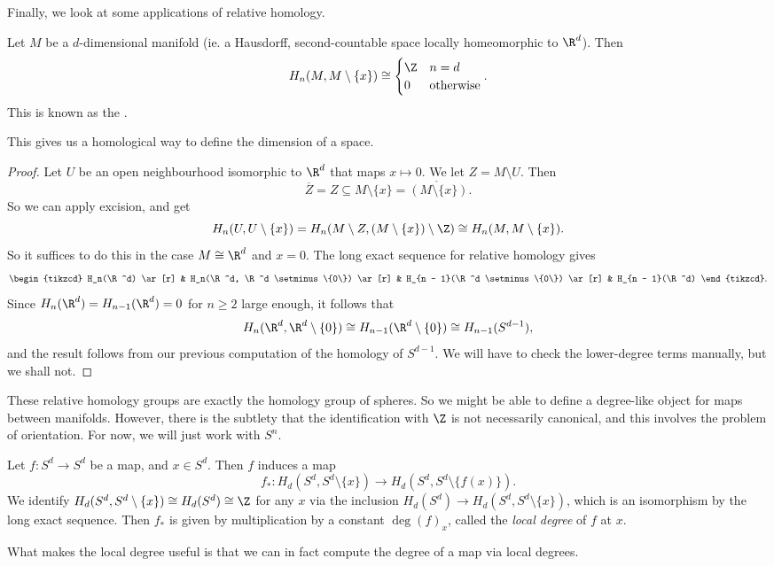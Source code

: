 \documentclass[a4paper]{article}
\theoremstyle{definition}
\begin{document}
Finally, we look at some applications of relative homology.

\begin{lemma}
  Let $M$ be a $d$-dimensional manifold (ie. a Hausdorff, second-countable space locally homeomorphic to $\R^d$). Then
  \[
    H_n(M, M \setminus \{x\}) \cong
    \begin{cases}
      \Z & n = d\\
      0 & \text{otherwise}
    \end{cases}.
  \]
  This is known as the .
\end{lemma}
This gives us a homological way to define the dimension of a space.

\begin{proof}
  Let $U$ be an open neighbourhood isomorphic to $\R^d$ that maps $x \mapsto 0$. We let $Z = M\setminus U$. Then
  \[
    \overline{Z} = Z \subseteq M \setminus \{x\} = \mathring{(M \setminus \{x\})}.
  \]
  So we can apply excision, and get
  \[
    H_n(U, U \setminus \{x\}) = H_n(M\setminus Z, (M\setminus \{x\})\setminus \Z) \cong H_n(M, M\setminus \{x\}).
  \]
  So it suffices to do this in the case $M \cong \R^d$ and $x = 0$. The long exact sequence for relative homology gives
  \[
    \begin{tikzcd}
      H_n(\R^d) \ar[r] & H_n(\R^d, \R^d \setminus \{0\}) \ar[r] & H_{n - 1}(\R^d \setminus \{0\}) \ar[r] & H_{n - 1}(\R^d)
    \end{tikzcd}.
  \]
  Since $H_n(\R^d) = H_{n - 1}(\R^d) = 0$ for $n \geq 2$ large enough, it follows that
  \[
    H_n(\R^d, \R^d \setminus \{0\}) \cong H_{n - 1}(\R^d \setminus \{0\}) \cong H_{n - 1}(S^{d - 1}),
  \]
  and the result follows from our previous computation of the homology of $S^{d - 1}$. We will have to check the lower-degree terms manually, but we shall not.
\end{proof}

These relative homology groups are exactly the homology group of spheres. So we might be able to define a degree-like object for maps between manifolds. However, there is the subtlety that the identification with $\Z$ is not necessarily canonical, and this involves the problem of orientation. For now, we will just work with $S^n$.

\begin{defi}
  Let $f: S^d \to S^d$ be a map, and $x \in S^d$. Then $f$ induces a map
  \[
    f_*: H_d(S^d, S^d \setminus \{x\}) \to H_d(S^d, S^d \setminus \{f(x)\}).
  \]
  We identify $H_d(S^d, S^d \setminus \{x\}) \cong H_d(S^d) \cong \Z$ for any $x$ via the inclusion $H_d(S^d) \to H_d(S^d, S^d \setminus \{x\})$, which is an isomorphism by the long exact sequence. Then $f_*$ is given by multiplication by a constant $\deg(f)_x$, called the \emph{local degree} of $f$ at $x$.
\end{defi}
What makes the local degree useful is that we can in fact compute the degree of a map via local degrees.
\end{document}
